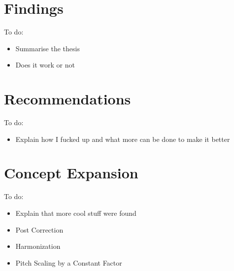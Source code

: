 
\section{Findings}

\color{red}
To do:
\begin{itemize}
	\item Summarise the thesis
	\item Does it work or not
\end{itemize}
\color{black}

\section{Recommendations}

\color{red}
To do:
\begin{itemize}
	\item Explain how I fucked up and what more can be done to make it better
\end{itemize}
\color{black}

\section{Concept Expansion}

\color{red}
To do:
\begin{itemize}
	\item Explain that more cool stuff were found
	\item Post Correction
	\item Harmonization
	\item Pitch Scaling by a Constant Factor
\end{itemize}
\color{black}
